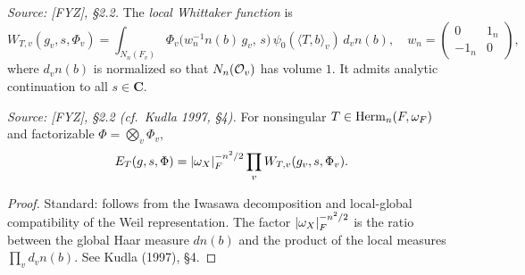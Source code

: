 \begin{definition}
  \label{def:local-whittaker}
  \textit{Source: [FYZ], \S2.2.}
  The \emph{local Whittaker function} is
  \[
    W_{T,v}(g_v, s, \Phi_v) = \int_{N_n(F_v)}
      \Phi_v\!\bigl(w_n^{-1} n(b)\, g_v,\, s\bigr)\,
      \psi_0(\langle T, b \rangle_v)\, d_v n(b),
    \quad w_n = \begin{pmatrix} 0 & 1_n \\ -1_n & 0 \end{pmatrix},
  \]
  where \(d_v n(b)\) is normalized so that \(N_n(\mathcal{O}_v)\) has volume \(1\). It
  admits analytic continuation to all \(s \in \mathbf{C}\).
\end{definition}

\begin{lemma}
  \label{lem:fourier-coeff-factorization}
  \textit{Source: [FYZ], \S2.2 (cf.\ Kudla 1997, \S4).}
  For nonsingular \(T \in \operatorname{Herm}_n(F, \omega_F)\) and factorizable
  \(\Phi = \bigotimes_v \Phi_v\),
  \[
    E_T(g, s, \Phi) = |\omega_X|_F^{-n^2/2} \prod_v W_{T,v}(g_v, s, \Phi_v).
  \]
\end{lemma}

\begin{proof}
  Standard: follows from the Iwasawa decomposition and local-global compatibility of
  the Weil representation. The factor \(|\omega_X|_F^{-n^2/2}\) is the ratio between the
  global Haar measure \(dn(b)\) and the product of the local measures
  \(\prod_v d_v n(b)\). See Kudla (1997), \S4.
\end{proof}

